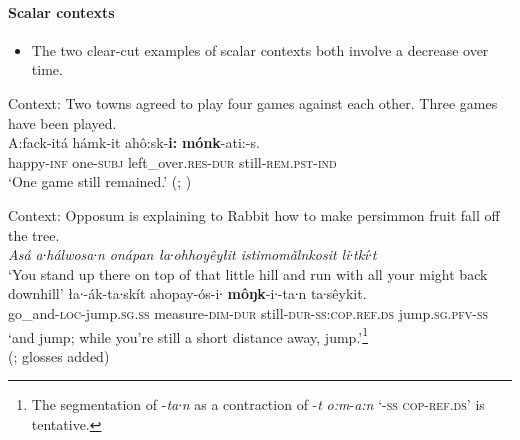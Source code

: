 \paragraph{Scalar contexts}
\label{appendixCreekScalar}
\begin{itemize}
	\item The two clear-cut examples of scalar contexts both involve a decrease over time.
\end{itemize}

\begin{exe}
	\ex
	Context: Two towns agreed to play four games against each other. Three games have been played.\\
	\gll A:fack-itá hámk-it ahô:sk-\textbf{i:} \textbf{mónk}-ati:-s.\\
	happy-\textsc{inf} one-\textsc{subj} left\_over.\textsc{res}-\textsc{dur} still-\textsc{rem}.\textsc{pst}-\textsc{ind}\\
	\glt \lq One game still remained.' (\cite[692]{HaasHill2014}; \cite[306]{Martin2011})
	
	\ex Context: Opposum is explaining to Rabbit how to make persimmon fruit fall off the tree.\\
	\textit{Asá a∙hálwosa∙n onápan ła∙ohhoyêyłit istimomǎlnkosit li∙tkí∙t}\\
\lq You stand up there on top of that little hill and run with all your might back downhill\rq{}
	\exi{}\gll
	ła∙-ák-ta∙skít ahopay-ós-i∙ \textbf{môŋk}-i∙-ta∙n ta∙sêykit.\\
	go\_and-\textsc{loc}-jump.\textsc{sg}.\textsc{ss} measure-\textsc{dim}-\textsc{dur} still-\textsc{dur}-\textsc{ss}:\textsc{cop}.\textsc{ref}.\textsc{ds} jump.\textsc{sg}.\textsc{pfv}-\textsc{ss}\\
	\glt \lq and jump; while you’re still a short distance away, jump.\rq{}\footnote{The segmentation of \mbox{-\textit{ta∙n}} as a contraction of \mbox{-\textit{t}} \mbox{\textit{o:m}-\textit{a:n}} \lq -\textsc{ss} \textsc{cop}-\textsc{ref}.\textsc{ds}\rq{ }is tentative.}
	\\(\cite[482]{HaasHill2014}; glosses added)
\end{exe}

